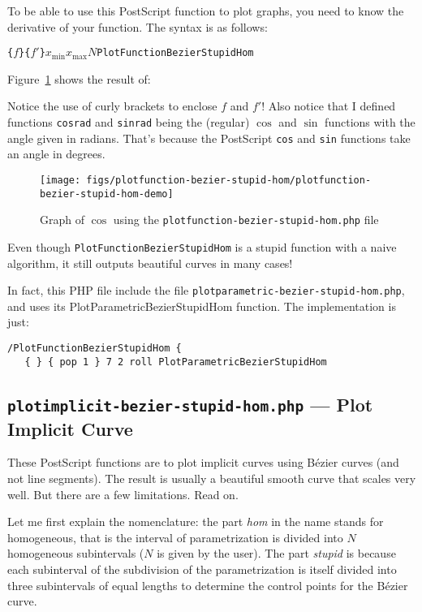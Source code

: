 \documentclass[10pt,a4paper]{scrartcl}
\newcommand\PS{PostScript}
\begin{document}
To be able to use this \PS{} function to plot graphs, you need to know the derivative of your function.
The syntax is as follows:
\begin{center}
\texttt{\{}$f$\texttt{\}}\quad\texttt{\{}$f'$\texttt{\}}\quad$x_{\text{min}}$\quad$x_{\text{max}}$\quad$N$\quad\texttt{PlotFunctionBezierStupidHom}
\end{center}

Figure~\ref{fig:plotfunction-bezier-stupid-hom-demo} shows the result of:

Notice the use of curly brackets to enclose $f$ and $f'$! Also notice that I
defined functions \texttt{cosrad} and \texttt{sinrad} being the (regular)
$\cos$ and $\sin$ functions with the angle given in radians. That's because the
\PS{} \texttt{cos} and \texttt{sin} functions take an angle in degrees.

\begin{figure}[ht!]%
\centering
\texttt{[image: figs/plotfunction-bezier-stupid-hom/plotfunction-bezier-stupid-hom-demo]}%
\caption{Graph of $\cos$ using the \texttt{plotfunction-bezier-stupid-hom.php} file}%
\label{fig:plotfunction-bezier-stupid-hom-demo}%
\end{figure}

Even though \texttt{PlotFunctionBezierStupidHom} is a stupid function with a
naive algorithm, it still outputs beautiful curves in many cases!

In fact, this PHP file include the file \texttt{plotparametric-bezier-stupid-hom.php},
and uses its PlotParametricBezierStupidHom function. The implementation is just:
\begin{lstlisting}
/PlotFunctionBezierStupidHom {
   { } { pop 1 } 7 2 roll PlotParametricBezierStupidHom
\end{lstlisting}

\subsection{\texttt{plotimplicit-bezier-stupid-hom.php} --- Plot Implicit Curve}
\label{ssec:plotimplicit-bezier-stupid-hom.php}
These \PS{} functions are to plot implicit curves using B\'ezier curves (and not
line segments). The result is usually a beautiful smooth curve that scales very
well. But there are a few limitations. Read on.

Let me first explain the nomenclature: the part \emph{hom} in the name stands
for homogeneous, that is the interval of parametrization is divided into $N$
homogeneous subintervals ($N$ is given by the user). The part \emph{stupid} is
because each subinterval of the subdivision of the parametrization is itself
divided into three subintervals of equal lengths to determine the control
points for the B\'ezier curve.
\end{document}
